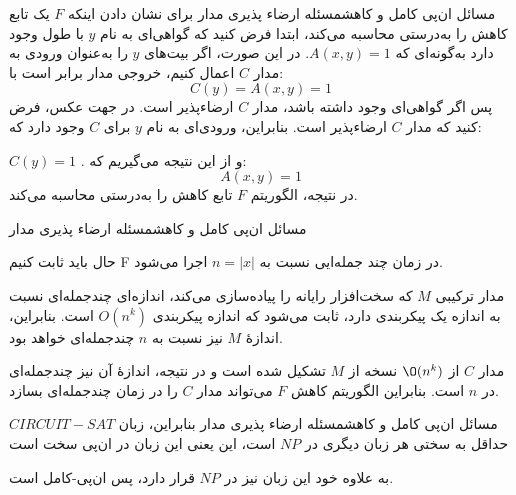 \begin{itemframe-s}{مسائل ان‌پی کامل و کاهش}{مسئله ارضاء پذیری مدار}
\itm
برای نشان دادن اینکه $F$ یک تابع کاهش را به‌درستی محاسبه می‌کند، ابتدا فرض کنید که گواهی‌ای به نام $y$ با طول وجود دارد به‌گونه‌ای که
$A(x, y) = 1$.
در این صورت، اگر بیت‌های $y$ را به‌عنوان ورودی به مدار $C$ اعمال کنیم، خروجی مدار برابر است با:
$$
C(y) = A(x, y) = 1
$$
پس اگر گواهی‌ای وجود داشته باشد، مدار $C$ ارضاء‌پذیر است.
\itm
در جهت عکس، فرض کنید که مدار $C$ ارضاءپذیر است. بنابراین، ورودی‌ای به نام $y$ برای $C$ وجود دارد که:

$C(y)=1$ .
و از این نتیجه می‌گیریم که:
$$A(x,y)=1$$
\itm
در نتیجه، الگوریتم $F$ تابع کاهش را به‌درستی محاسبه می‌کند.
\end{itemframe-s}

\begin{itemframe-s}{مسائل ان‌پی کامل و کاهش}{مسئله ارضاء پذیری مدار}

\itm
حال باید ثابت کنیم F در زمان چند جمله‌ایی نسبت به
$n = |x|$
اجرا می‌شود.

\itm
مدار ترکیبی $M$ که سخت‌افزار رایانه را پیاده‌سازی می‌کند، اندازه‌ای چندجمله‌ای نسبت به اندازه یک پیکربندی دارد، ثابت می‌شود که اندازه پیکربندی
$O(n^k)$
است. بنابراین، اندازهٔ $M$ نیز نسبت به $n$ چندجمله‌ای خواهد بود.

\itm
مدار $C$ از $\O(n^k)$ نسخه از $M$ تشکیل شده است و در نتیجه، اندازهٔ آن نیز چندجمله‌ای در $n$ است.
بنابراین الگوریتم کاهش $F$ می‌تواند مدار $C$ را در زمان چندجمله‌ای بسازد.

\end{itemframe-s}

\begin{itemframe-s}{مسائل ان‌پی کامل و کاهش}{مسئله ارضاء پذیری مدار}
\itm
بنابراین، زبان $CIRCUIT-SAT$ حداقل به سختی هر زبان دیگری در $NP$ است، این یعنی این زبان در ان‌پی سخت است

\itm
به علاوه خود این زبان نیز در
$NP$
قرار دارد، پس ان‌پی‌-کامل است.

\end{itemframe-s}
